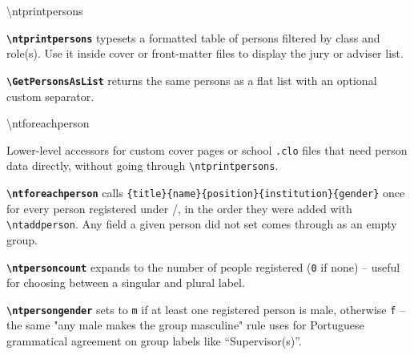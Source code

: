\bigskip

\begin{macrodoc}{\textbackslash ntprintpersons}

\textbf{\texttt{\textbackslash ntprintpersons}} typesets a formatted
table of persons filtered by class and role(s).  Use it inside cover
or front-matter files to display the jury or adviser list.

\textbf{\texttt{\textbackslash GetPersonsAsList}} returns the same
persons as a flat list with an optional custom separator.

\begin{latexcode}
\end{latexcode}
\end{macrodoc}

\bigskip

\begin{macrodoc}{\textbackslash ntforeachperson}

Lower-level accessors for custom cover pages or school \texttt{.clo}
files that need person data directly, without going through
\texttt{\textbackslash ntprintpersons}.

\textbf{\texttt{\textbackslash ntforeachperson}} calls
\texttt{\{title\}\{name\}\{position\}\{institution\}\{gender\}}
once for every person registered under /, in the
order they were added with \texttt{\textbackslash ntaddperson}.  Any
field a given person did not set comes through as an empty group.

\textbf{\texttt{\textbackslash ntpersoncount}} expands to the number of
people registered (\texttt{0} if none) -- useful for choosing between a
singular and plural label.

\textbf{\texttt{\textbackslash ntpersongender}} sets 
to \texttt{m} if at least one registered person is male, otherwise
\texttt{f} -- the same "any male makes the group masculine" rule
\novathesis{} uses for Portuguese grammatical agreement on group
labels like ``Supervisor(s)''.

\end{macrodoc}

